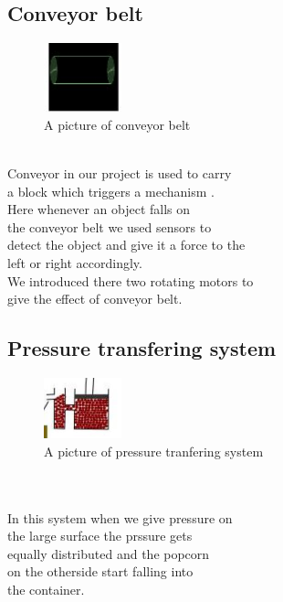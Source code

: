 \subsection{Conveyor belt}
\begin{figure}
	\caption{A picture of conveyor belt}
	\centering
	 \includegraphics[width=0.2\textwidth]{conveyorbelt.jpg}%
\end{figure}
\begin{frame}
\centering
\\
Conveyor in our project is used to carry\\ a block which triggers a mechanism . \\
Here whenever an object falls on\\ the conveyor belt we used sensors to \\detect the object and give it a force to the \\left or right accordingly.\\We introduced there two rotating motors to\\ give the effect of conveyor belt. 
\end{frame}

\newpage
\subsection{Pressure transfering system}
\begin{figure}
	\caption{A picture of pressure tranfering system}
	\centering
	 \includegraphics[width=0.2\textwidth]{pasc.jpg}%
\end{figure}
\begin{frame}
\centering
\\
\\
In this system when we give pressure on \\the large surface the prssure gets\\ equally distributed and the popcorn\\ on the otherside start falling into \\the container.
\end{frame}
\\
\\
\\
\\
